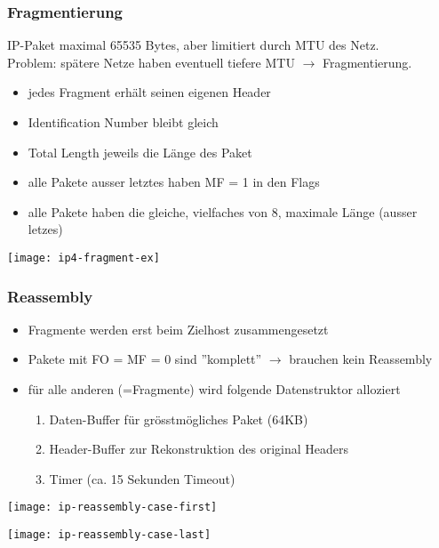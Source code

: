 \subsubsection{Fragmentierung}

IP-Paket maximal 65535 Bytes, aber limitiert durch MTU des Netz. \\
Problem: spätere Netze haben eventuell tiefere MTU $\rightarrow$ Fragmentierung.

\begin{itemize}
    \item jedes Fragment erhält seinen eigenen Header
    \item Identification Number bleibt gleich
    \item Total Length jeweils die Länge des Paket
    \item alle Pakete ausser letztes haben MF = 1 in den Flags
    \item alle Pakete haben die gleiche, vielfaches von 8, maximale Länge (ausser letzes)
\end{itemize}
\begin{center}
    \texttt{[image: ip4-fragment-ex]}
\end{center}


\subsubsection{Reassembly}

\begin{itemize}
    \item Fragmente werden erst beim Zielhost zusammengesetzt
    \item Pakete mit FO = MF = 0 sind ''komplett'' $\rightarrow$ brauchen kein Reassembly
    \item für alle anderen (=Fragmente) wird folgende Datenstruktor alloziert
          \begin{enumerate}
              \item Daten-Buffer für grösstmögliches Paket (64KB)
              \item Header-Buffer zur Rekonstruktion des original Headers
              \item Timer (ca. 15 Sekunden Timeout)
          \end{enumerate}
\end{itemize}

\texttt{[image: ip-reassembly-case-first]}

\texttt{[image: ip-reassembly-case-last]}

